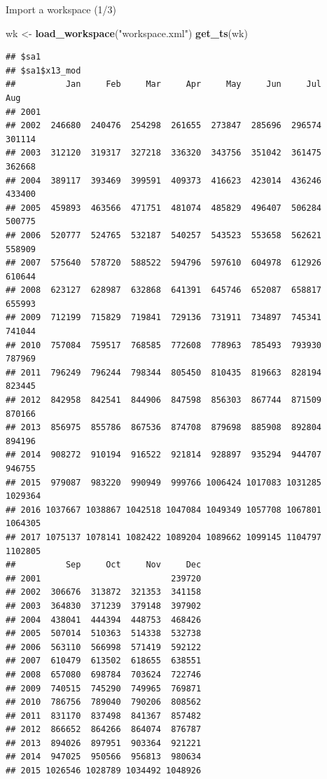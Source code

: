 \documentclass[10pt,xcolor=table,color={dvipsnames,usenames},ignorenonframetext,usepdftitle=false,french]{beamer}
\newenvironment{Shaded}{\begin{snugshade}}{\end{snugshade}}
\newcommand{\KeywordTok}[1]{\textcolor[rgb]{0.13,0.29,0.53}{\textbf{#1}}}
\newcommand{\StringTok}[1]{\textcolor[rgb]{0.31,0.60,0.02}{#1}}
\newcommand{\NormalTok}[1]{#1}
\begin{document}
\begin{frame}[fragile]{Import a workspace (1/3)}

\footnotesize

\begin{Shaded}
\begin{Highlighting}[]
\NormalTok{wk <-}\StringTok{ }\KeywordTok{load_workspace}\NormalTok{(}\StringTok{"workspace.xml"}\NormalTok{)}
\KeywordTok{get_ts}\NormalTok{(wk)}
\end{Highlighting}
\end{Shaded}

\begin{verbatim}
## $sa1
## $sa1$x13_mod
##          Jan     Feb     Mar     Apr     May     Jun     Jul     Aug
## 2001                                                                
## 2002  246680  240476  254298  261655  273847  285696  296574  301114
## 2003  312120  319317  327218  336320  343756  351042  361475  362668
## 2004  389117  393469  399591  409373  416623  423014  436246  433400
## 2005  459893  463566  471751  481074  485829  496407  506284  500775
## 2006  520777  524765  532187  540257  543523  553658  562621  558909
## 2007  575640  578720  588522  594796  597610  604978  612926  610644
## 2008  623127  628987  632868  641391  645746  652087  658817  655993
## 2009  712199  715829  719841  729136  731911  734897  745341  741044
## 2010  757084  759517  768585  772608  778963  785493  793930  787969
## 2011  796249  796244  798344  805450  810435  819663  828194  823445
## 2012  842958  842541  844906  847598  856303  867744  871509  870166
## 2013  856975  855786  867536  874708  879698  885908  892804  894196
## 2014  908272  910194  916522  921814  928897  935294  944707  946755
## 2015  979087  983220  990949  999766 1006424 1017083 1031285 1029364
## 2016 1037667 1038867 1042518 1047084 1049349 1057708 1067801 1064305
## 2017 1075137 1078141 1082422 1089204 1089662 1099145 1104797 1102805
##          Sep     Oct     Nov     Dec
## 2001                          239720
## 2002  306676  313872  321353  341158
## 2003  364830  371239  379148  397902
## 2004  438041  444394  448753  468426
## 2005  507014  510363  514338  532738
## 2006  563110  566998  571419  592122
## 2007  610479  613502  618655  638551
## 2008  657080  698784  703624  722746
## 2009  740515  745290  749965  769871
## 2010  786756  789040  790206  808562
## 2011  831170  837498  841367  857482
## 2012  866652  864266  864074  876787
## 2013  894026  897951  903364  921221
## 2014  947025  950566  956813  980634
## 2015 1026546 1028789 1034492 1048926

\end{verbatim}
\end{frame}
\end{document}
